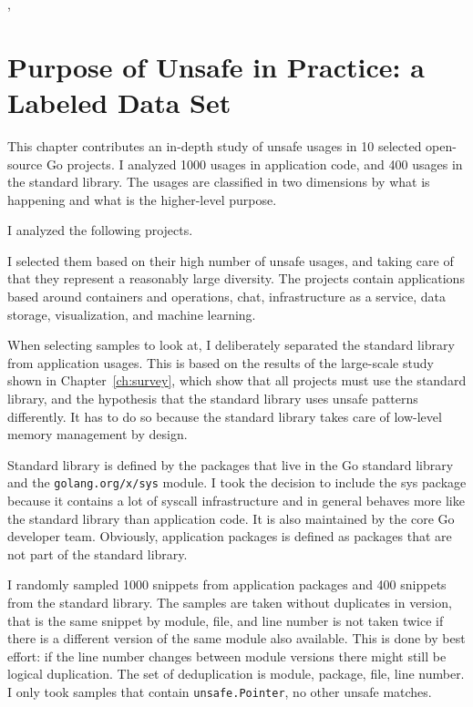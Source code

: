 \toolVet{}, \toolGosec{}





\section{Purpose of Unsafe in Practice: a Labeled Data Set}\label{sec:go-geiger:labeled-dataset}

This chapter contributes an in-depth study of unsafe usages in 10 selected open-source Go projects.
I analyzed 1000 usages in application code, and 400 usages in the standard library.
The usages are classified in two dimensions by what is happening and what is the higher-level purpose.

I analyzed the following projects.



I selected them based on their high number of unsafe usages, and taking care of that they represent a reasonably large
diversity.
The projects contain applications based around containers and operations, chat, infrastructure as a service, data
storage, visualization, and machine learning.

When selecting samples to look at, I deliberately separated the standard library from application usages.
This is based on the results of the large-scale study shown in Chapter~\ref{ch:survey}, which show that all projects
must use the standard library, and the hypothesis that the standard library uses unsafe patterns differently.
It has to do so because the standard library takes care of low-level memory management by design.

Standard library is defined by the packages that live in the Go standard library and the \texttt{golang.org/x/sys}
module.
I took the decision to include the sys package because it contains a lot of syscall infrastructure and in general
behaves more like the standard library than application code.
It is also maintained by the core Go developer team.
Obviously, application packages is defined as packages that are not part of the standard library.

I randomly sampled 1000 snippets from application packages and 400 snippets from the standard library.
The samples are taken without duplicates in version, that is the same snippet by module, file, and line number is not
taken twice if there is a different version of the same module also available.
This is done by best effort: if the line number changes between module versions there might still be logical
duplication.
The set of deduplication is module, package, file, line number.
I only took samples that contain \texttt{unsafe.Pointer}, no other unsafe matches.

